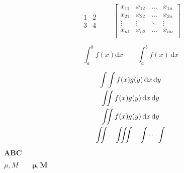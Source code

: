 \documentclass[]{ctexart}
\begin{document}
	\iffalse
	我们当然也可以用 array 环境排版各种矩阵。amsmath 宏包还直接提供了多种排版矩阵的
	环境，包括不带定界符的 matrix，以及带各种定界符的矩阵 pmatrix（�）、bmatrix（�）、Bmatrix
	（�）、vmatrix（
	��）、Vmatrix（
	��）。使用这些环境时，无需给定列格式
	\fi

	\[
		\begin{matrix}
			1 & 2 \\ 3 & 4
		\end{matrix} \qquad
		\begin{bmatrix}
			x_{11} & x_{12} & \ldots & x_{1n} \\
			x_{21} & x_{22} & \ldots & x_{2n} \\
			\vdots & \vdots & \ddots & \vdots \\
			x_{n1} & x_{n2} & \ldots & x_{nn} \\
		\end{bmatrix}
	\]

	\[
		\int_a^b f(x)\mathrm{d}x
		\qquad
		\int_a^b f(x)\,\mathrm{d}x
	\]

	\newcommand\diff{\,\mathrm{d}}
	\begin{gather*}
		\int\int f(x)g(y)
		\diff x \diff y \\
		\int\!\!\!\int
		f(x)g(y) \diff x \diff y \\
		\iint f(x)g(y) \diff x \diff y \\
		\iint\quad \iiint\quad \idotsint
	\end{gather*}

	$\mathbf{ABC}$

	$\mu, M \qquad
	\boldsymbol{\mu}, \boldsymbol{M}$
\end{document}
